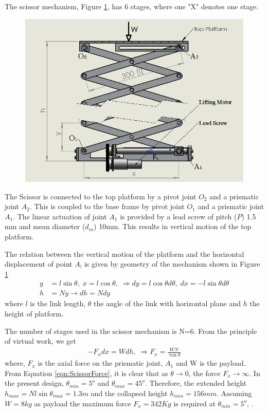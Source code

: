 The scissor mechanism, Figure \ref{fig:scissor}, has 6 stages, where one "X" denotes one stage. 
\begin{figure}
	\centering
	\includegraphics[width=\linewidth,keepaspectratio]{Chapter3/fig/scissor}
	\label{fig:scissor}
\end{figure}
The Scissor is connected to the top platform by a pivot joint $O_2$ and a prismatic joint $ A_2$.
 This is coupled to the base frame by pivot joint $O_1$ and a prismatic joint $A_1$. The linear actuation of joint $A_1$ is provided by a lead screw of pitch ($P$) 1.5 mm and mean diameter ($d_m$) 10mm.
  This results in vertical motion of the top platform. 
  
 The relation between the vertical motion of the platform and the horizontal displacement of point $A_!$ is given by geometry of the mechanism shown in Figure \ref{fig:scissor} 
\begin{equation}
\begin{aligned}
y&=l\sin\theta,\; x=l\cos\theta,\; \Rightarrow dy=l\cos\theta d\theta, \; dx=-l\sin\theta d\theta\\
h&=Ny\rightarrow dh=Ndy
\end{aligned}
\end{equation} 
where $l$ is the link length, $\theta$ the angle of the link with horizontal plane and $h$ the height of platform.


The number of stages used in the scissor mechanism is N=6. From the principle of virtual work, we get 
\begin{equation}
\label{eqn:ScissorForce}
\begin{aligned}
-F_xdx=Wdh,\;\Rightarrow F_x=\frac{WN}{\tan\theta}
\end{aligned}
\end{equation}
where, $F_x$ is the axial force on the prismatic joint, $A_1$ and W is the payload. From Equation \ref{eqn:ScissorForce}, it is clear that as $\theta\rightarrow 0$, the force  $F_x \rightarrow \infty$. In the present design,  $\theta_{min}=5^o$ and $\theta_{max}=45^o$. Therefore, the extended height  $h_{max}=Nl\sin\theta_{max}=1.3m$ and the collapsed height $h_{min}=156mm$. Assuming $W=8kg$ as payload the maximum force $F_x=342Kg$ is required at $\theta_{min}=5^o$, . 

